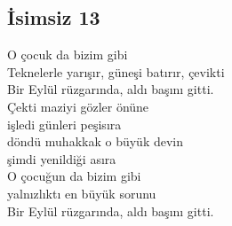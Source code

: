 \subsection{İsimsiz 13}

O çocuk da bizim gibi \\
Teknelerle yarışır, güneşi batırır, çevikti \\
Bir Eylül rüzgarında, aldı başını gitti. \\

\noindent\newline
Çekti maziyi gözler önüne \\
işledi günleri peşisıra \\
döndü muhakkak o büyük devin \\
şimdi yenildiği asıra \\
O çocuğun da bizim gibi \\
yalnızlıktı en büyük sorunu \\
Bir Eylül rüzgarında, aldı başını gitti. \\